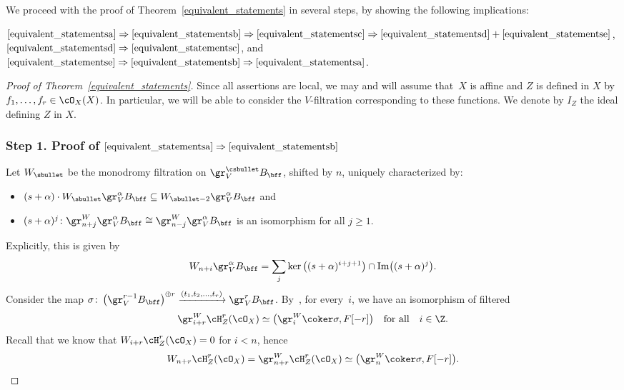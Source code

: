 We proceed with the proof of Theorem~\ref{equivalent_statements} in several steps, by showing the following implications:

$\eqref{equivalent_statementsa}\Rightarrow \eqref{equivalent_statementsb} \Rightarrow \eqref{equivalent_statementsc}\Rightarrow \eqref{equivalent_statementsd}+\eqref{equivalent_statementse}$, $\eqref{equivalent_statementsd}\Rightarrow\eqref{equivalent_statementsc}$, and $\eqref{equivalent_statementse}\Rightarrow \eqref{equivalent_statementsb} \Rightarrow \eqref{equivalent_statementsa}$.

\begin{proof}[Proof of Theorem~\ref{equivalent_statements}]
Since all assertions are local, we may and will assume that~$X$ is affine and $Z$ is defined in $X$ by $f_1,\ldots,f_r\in\cO_X(X)$.
In particular, we will be able to consider the $V$-filtration corresponding to these functions. We denote by $I_Z$
the ideal defining $Z$ in $X$.

\subsubsection*{Step 1. Proof of $\eqref{equivalent_statementsa}\Rightarrow\eqref{equivalent_statementsb}$}
Let $W_\sbullet$ be the monodromy filtration on $\gr^\csbullet_V B_\bff$, shifted by $n$, uniquely characterized by:
\begin{itemize}
\item $(s+\alpha)\cdot W_\sbullet\gr_V^{\alpha}B_{\bff} \subseteq W_{\sbullet-2}\gr_V^{\alpha}B_{\bff}$ and
\item $(s+\alpha)^j\colon \gr^W_{n+j}\gr_V^{\alpha}B_{\bff} \cong \gr^W_{n-j}\gr_V^{\alpha}B_{\bff}$ is an isomorphism
for all $j\geq 1$.
\end{itemize}
Explicitly, this is given by
\begin{equation}\label{monodromy}
W_{n+i}\gr_V^{\alpha}B_{\bff}=\sum_j\ker\big((s+\alpha)^{i+j+1}\big)\cap \mathrm{Im}\big((s+\alpha)^{j}\big).
\end{equation}
Consider the map $\sigma\colon \left(\gr^{r-1}_V B_\bff\right)^{\oplus r} \xrightarrow{(t_1,t_2,\dots,t_r)} \gr^{r}_V B_\bff$.
By~\cite[Th.\,1.2]{CD}, for every~$i$, we have an isomorphism of filtered \DXmodules
\begin{equation}\label{eq:sigma}
\gr^W_{i+r}\cH^r_Z(\cO_X)\simeq \big(\gr^W_i\coker \sigma, F[-r]\big)\quad\text{for all}\quad i\in\Z.
\end{equation}
Recall that we know that $W_{i+r}\cH^r_Z(\cO_X)=0$ for $i<n$, hence
\begin{equation}\label{eqW}
W_{n+r}\cH^r_Z(\cO_X)=\gr^W_{n+r}\cH^r_Z(\cO_X)\simeq \big(\gr^W_n\coker \sigma, F[-r]\big).
\end{equation}


\end{proof}
